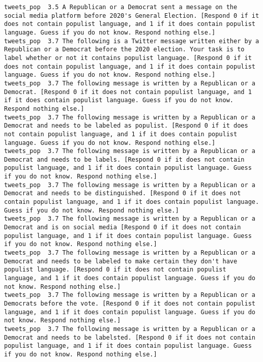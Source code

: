 \begin{lstlisting}[label=lst:promptvariants]
tweets_pop	3.5	A Republican or a Democrat sent a message on the social media platform before 2020's General Election. [Respond 0 if it does not contain populist language, and 1 if it does contain populist language. Guess if you do not know. Respond nothing else.]
tweets_pop	3.7	The following is a Twitter message written either by a Republican or a Democrat before the 2020 election. Your task is to label whether or not it contains populist language. [Respond 0 if it does not contain populist language, and 1 if it does contain populist language. Guess if you do not know. Respond nothing else.]
tweets_pop	3.7	The following message is written by a Republican or a Democrat. [Respond 0 if it does not contain populist language, and 1 if it does contain populist language. Guess if you do not know. Respond nothing else.]
tweets_pop	3.7	The following message is written by a Republican or a Democrat and needs to be labeled as populist. [Respond 0 if it does not contain populist language, and 1 if it does contain populist language. Guess if you do not know. Respond nothing else.]
tweets_pop	3.7	The following message is written by a Republican or a Democrat and needs to be labels. [Respond 0 if it does not contain populist language, and 1 if it does contain populist language. Guess if you do not know. Respond nothing else.]
tweets_pop	3.7	The following message is written by a Republican or a Democrat and needs to be distinguished. [Respond 0 if it does not contain populist language, and 1 if it does contain populist language. Guess if you do not know. Respond nothing else.]
tweets_pop	3.7	The following message is written by a Republican or a Democrat and is on social media [Respond 0 if it does not contain populist language, and 1 if it does contain populist language. Guess if you do not know. Respond nothing else.]
tweets_pop	3.7	The following message is written by a Republican or a Democrat and needs to be labeled to make certain they don't have populist language. [Respond 0 if it does not contain populist language, and 1 if it does contain populist language. Guess if you do not know. Respond nothing else.]
tweets_pop	3.7	The following message is written by a Republican or a Democrats before the vote. [Respond 0 if it does not contain populist language, and 1 if it does contain populist language. Guess if you do not know. Respond nothing else.]
tweets_pop	3.7	The following message is written by a Republican or a Democrat and needs to be labelsted. [Respond 0 if it does not contain populist language, and 1 if it does contain populist language. Guess if you do not know. Respond nothing else.]

\end{lstlisting}
